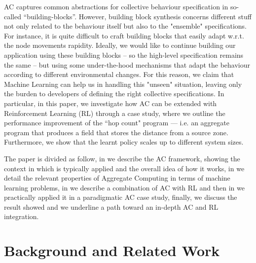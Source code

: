 \documentclass[conference]{IEEEtran}
\begin{document}
AC captures common abstractions for collective behaviour specification in so-called ``building-blocks''. 
However, building block synthesis concerns different stuff not only related to the behaviour itself
 but also to the "ensemble" specifications. 
 For instance, it is quite difficult to craft building blocks
 that easily adapt w.r.t. the node movements rapidity.
%
Ideally, we would like to continue building our application using these building blocks -- so the high-level specification remains the same -- but using some
 under-the-hood mechanisms that adapt the behaviour according to different environmental changes. For this reason, we claim that Machine Learning can help us in handling this "unseen" situation, leaving only the burden
 to developers of defining the right collective specifications.
In particular, in this paper,
 we investigate how AC can be extended with Reinforcement Learning (RL) through a case study,
 where we outline the performance improvement of the ``hop count" program ---
 i.e. an aggregate program that produces a field that stores the distance from a source zone. 
 Furthermore, we show that the learnt policy scales up to different system sizes.

The paper is divided as follow, in  we describe
 the AC framework, showing the context in which
 is typically applied and the overall idea of how it works, in  we detail the relevant properties of Aggregate
 Computing in terms of machine learning problems, in  we describe a combination of AC with RL and then in
  we practically applied it in a paradigmatic AC case study,
 finally,  we discuss the result showed and we underline a path toward an in-depth AC and RL integration.

 \section{Background and Related Work}\label{background}

\end{document}

